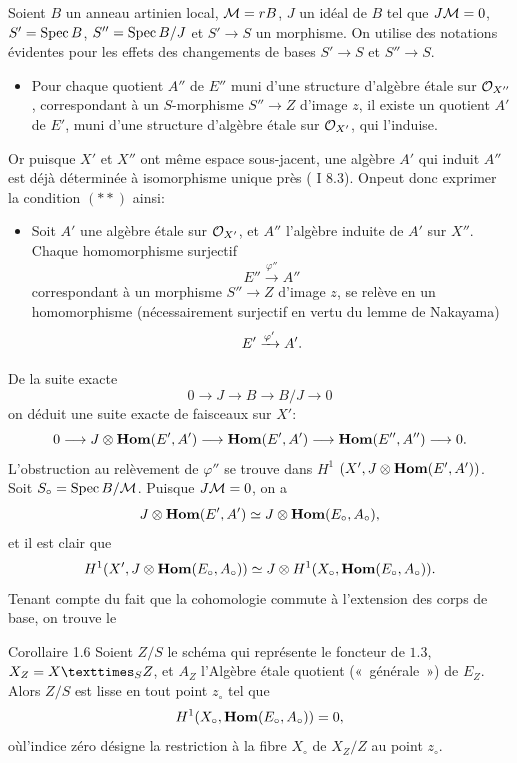 \documentclass[10pt]{../fichiers-configuration-latex/smfart}
\begin{document}
Soient $B$ un anneau artinien local, ${\mathcal M}=rB$, $J$ un idéal de
$B$ tel que $J{\mathcal M}=0$, $S'=\operatorname{Spec} B$, $S''=\operatorname{Spec} B/J$ et
$S'\rightarrow S$ un morphisme. On utilise des notations évidentes
pour les effets des changements de bases $S'\rightarrow S$ et
$S''\rightarrow S$.

\begin{itemize}
\item[$(\ast)$] Pour chaque quotient $A''$ de $E''$ muni d'une
structure d'algèbre étale sur ${\mathcal O}_{X''}$, correspondant à un
$S$-morphisme $S''\rightarrow Z$ d'image $z$, il existe un quotient
$A'$ de $E'$, muni d'une structure d'algèbre étale sur ${\mathcal O}_{X'}$,
qui l'induise.
\end{itemize}

Or puisque $X'$ et $X''$ ont même espace sous-jacent, une algèbre $A'$
qui induit $A''$ est déjà déterminée à isomorphisme unique près (\SGA
I 8.3). On\pageoriginale peut donc exprimer la condition
$({\ast}{\ast})$ ainsi:

\begin{itemize}
\item[$({\ast}{\ast})$] Soit $A'$ une algèbre étale sur ${\mathcal O}_{X'}$,
et $A''$ l'algèbre induite de $A'$ sur $X''$. Chaque homomorphisme
surjectif
$$
E''\xrightarrow{\varphi''}A''
$$
correspondant à un morphisme $S''\rightarrow Z$ d'image $z$, se relève
en un homomorphisme (nécessairement surjectif en vertu du lemme de
Nakayama)
$$
E'\xrightarrow{\varphi'}A'{}.
$$
\end{itemize}

De la suite exacte
$$
0\longrightarrow J\longrightarrow B\longrightarrow B/J\longrightarrow
0
$$
on déduit une suite exacte de faisceaux sur $X'$:
$$
0\longrightarrow J\otimes \operatorname{\mathbf{Hom}}(E',A')\longrightarrow
\operatorname{\mathbf{Hom}}(E',A')\longrightarrow \operatorname{\mathbf{Hom}}(E'', A'')\longrightarrow
0{}.
$$
L'obstruction au relèvement de $\varphi''$ se trouve dans $H^1$
$(X',J\otimes \operatorname{\mathbf{Hom}}(E',A'))$. Soit $S_{\circ}=\operatorname{Spec}
B/{\mathcal M}$. Puisque $J{\mathcal M}=0$, on a
$$
J\otimes \operatorname{\mathbf{Hom}}(E',A')\simeq J\otimes
\operatorname{\mathbf{Hom}}(E_{\circ},A_{\circ}){},
$$
et il est clair que
$$
H^1(X',J\otimes \operatorname{\mathbf{Hom}}(E_{\circ},A_{\circ}))\simeq J\otimes
H^1(X_{\circ},\operatorname{\mathbf{Hom}}(E_{\circ},A_{\circ})){}.
$$
Tenant compte du fait que la cohomologie commute à l'extension des
corps de base, on trouve le

\begin{enonce*}{Corollaire 1.6}
Soient $Z/S$ le schéma qui représente le foncteur de $1.3$,
$X_Z=\fprod{X}{Z}{S}$, et $A_Z$ l'Algèbre étale quotient
(« générale ») de $E_Z$. Alors $Z/S$ est lisse en tout point $z_{\circ}$ tel que
$$
H^1(X_{\circ},\operatorname{\mathbf{Hom}}(E_{\circ},A_{\circ}))=0{},
$$
où\pageoriginale l'indice zéro désigne la restriction à la fibre
$X_{\circ}$ de $X_Z/Z$ au point $z_{\circ}$.
\end{enonce*}
\end{document}
